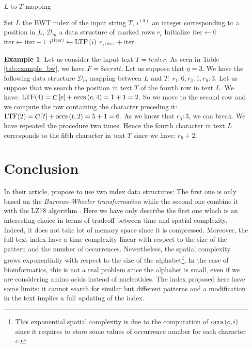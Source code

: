 \documentclass[11pt,twoside]{article}
\theoremstyle{definition}
\newtheorem{example}{Example}
\def\func#1{\mathop{\rm #1}}
\def\counts{\func{C}\nolimits}
\def\occs{\func{occs}\nolimits}
\def\ltf{\func{LTF}\nolimits}
\def\iter{\mathrm{iter}}
\begin{document}
\begin{algorithm}[h]
\caption{$L$-to-$T$ mapping}
\label{alg:bwt_text_mapping}
\begin{algorithmic}
\State Set $L$ the BWT index of the input string $T$, $i^{\left(0\right)}$ an integer corresponding to a position in $L$, $\mathcal{D}_{m}$ a data structure of marked rows $r_{i}$
\State Initialize $\iter \leftarrow 0$
 \State $\iter \leftarrow \iter + 1$
 \State $i^{\left(\iter\right)} \leftarrow \ltf\left(i\right)$
\EndWhile
\State \Return $r_{i^{\left(\iter\right)}} + \iter$
\end{algorithmic}
\end{algorithm}

\begin{example}
Let us consider the input text $T = \textit{tester}$. As seen in Table \ref{tab:example_bw}, we have $F = \$eerstt$. Let us suppose that $\eta = 3$. We have the following data structure $\mathcal{D}_{m}$ mapping between $L$ and $T$: $r_{1} : 6, r_{3} : 1, r_{6} : 3$. Let us suppose that we search the position in text $T$ of the fourth row in text $L$. We have: $\ltf(4) = \counts\left[e\right] + \occs\left(e, 4\right) = 1 + 1 = 2$. So we move to the second row and we compute the row containing the character preceding it: $\ltf(2) = \counts\left[t\right] + \occs\left(t, 2\right) = 5 + 1 = 6$. As we know that $r_{6} : 3$, we can break. We have repeated the procedure two times. Hence the fourth character in text $L$ corresponds to the fifth character in text $T$ since we have: $r_{6} + 2$.
\end{example}

\section{Conclusion}\label{sec:conclusion}

In their article, \citet{Ferragina-2005} propose to use two index data structures: The first one is only based on the \textit{Burrows-Wheeler transformation} \citep{Burrows-1994} while the second one combine it with the LZ78 algorithm \citep{Ziv-1978}. Here we have only describe the first one which is an interesting choice in terms of tradeoff between time and spatial complexity. Indeed, it does not take lot of memory space since it is compressed. Moreover, the full-text index have a time complexity linear with respect to the size of the pattern and the number of occurrences. Nevertheless, the spatial complexity grows exponentially with respect to the size of the alphabet\footnote{This exponential spatial complexity is due to the computation of $\occs\left(c, i\right)$ since it requires to store some values of occurrence number for each character $c$.}. In the case of bioinformatics, this is not a real problem since the alphabet is small, even if we are considering amino acids instead of nucleotides. The index proposed here have some limits: it cannot search for similar but different patterns and a modification in the text implies a full updating of the index.\medskip
\end{document}
